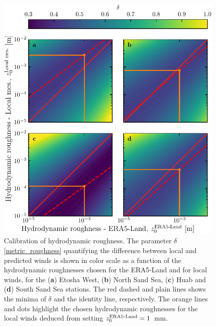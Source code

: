 \begin{figure}[p]
\centering
\includegraphics[scale=1]{Figures/Figure3_supp.pdf}
\caption{Calibration of hydrodynamic roughness. The parameter $\delta$ \eqref{metric_roughness} quantifying the difference between local and predicted winds is shown in color scale as a function of the hydrodynamic roughnesses chosen for the ERA5-Land and for local winds, for the (\textbf{a}) Etosha West, (\textbf{b}) North Sand Sea, (\textbf{c}) Huab and (\textbf{d}) South Sand Sea stations. The red dashed and plain lines shows the minima of $\delta$ and the identity line, respectively. The orange lines and dots highlight the chosen hydrodynamic roughnesses for the local winds deduced from setting $z_{0}^{\textup{ERA5-Land}} = 1$~mm.}
\label{Fig3_supp}
\end{figure}

